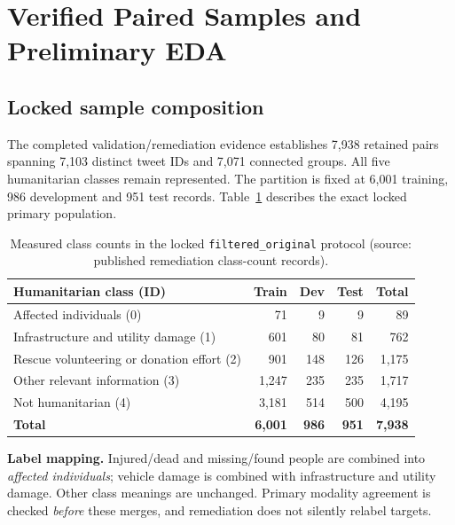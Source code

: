 \documentclass[11pt,a4paper]{article}
\newcommand{\primary}{\texttt{filtered\_original}}
\begin{document}
\section{Verified Paired Samples and Preliminary EDA}
\subsection{Locked sample composition}
The completed validation/remediation evidence establishes 7,938 retained pairs spanning 7,103 distinct tweet IDs and 7,071 connected groups. All five humanitarian classes remain represented. The partition is fixed at 6,001 training, 986 development and 951 test records. Table~\ref{tab:classcounts} describes the exact locked primary population.
\begin{table}[htbp]
\centering\small
\caption{Measured class counts in the locked \primary{} protocol (source: published remediation class-count records).}
\label{tab:classcounts}
\begin{tabularx}{\linewidth}{@{}>{\raggedright\arraybackslash}Xrrrr@{}}
\toprule
Humanitarian class (ID) & Train & Dev & Test & Total \\
\midrule
Affected individuals (0) & 71 & 9 & 9 & 89 \\
Infrastructure and utility damage (1) & 601 & 80 & 81 & 762 \\
Rescue volunteering or donation effort (2) & 901 & 148 & 126 & 1,175 \\
Other relevant information (3) & 1,247 & 235 & 235 & 1,717 \\
Not humanitarian (4) & 3,181 & 514 & 500 & 4,195 \\
\midrule
\textbf{Total} & \textbf{6,001} & \textbf{986} & \textbf{951} & \textbf{7,938} \\
\bottomrule
\end{tabularx}
\end{table}
\textbf{Label mapping.} Injured/dead and missing/found people are combined into \emph{affected individuals}; vehicle damage is combined with infrastructure and utility damage. Other class meanings are unchanged. Primary modality agreement is checked \emph{before} these merges, and remediation does not silently relabel targets.
\end{document}
